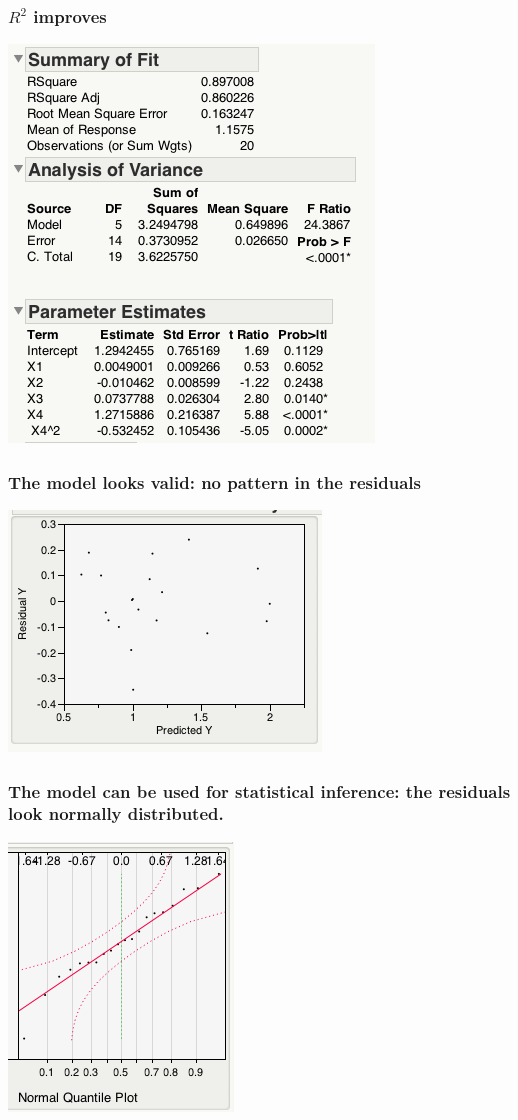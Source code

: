 \documentclass[handout]{beamer}\usepackage{graphicx, color}
\numberwithin{equation}{section}
\begin{document}
\begin{frame}
\frametitle{$R^2$ improves}
\begin{center}
 \includegraphics{../../fig/x43.png}
\end{center}
\end{frame}

\begin{frame}
\frametitle{The model looks valid: no pattern in the residuals}
\begin{center}
 \includegraphics{../../fig/x44.png}
\end{center}
\end{frame}

\begin{frame}
\frametitle{\small The model can be used for statistical inference: the residuals look normally distributed.}
\begin{center}
 \includegraphics{../../fig/x45.png}
\end{center}
\end{frame}
\end{document}
